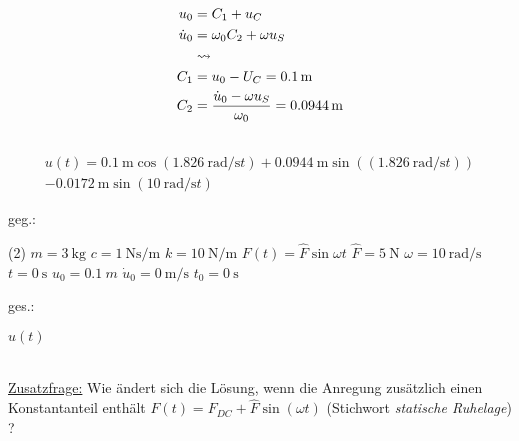 \documentclass[12pt]{exam}
\begin{document}
\begin{questions}
\begin{solution}
    \begin{align*}
        u_0 &= C_1 + u_C \\
        \dot{u}_0 &= \omega_0 C_2+\omega u_S\\
        &\rightsquigarrow \\
        C_1 &=  u_0 - U_C = \SI{0.1}{\meter}\\
        C_2 &= \frac{\dot{u}_0 - \omega u_S}{\omega_0} = \SI{0.0944}{\meter} \\
        \vspace{1cm}
        \end{align*}
        \begin{equation*}
            \begin{split}
        u(t) = \SI{0.1}{\meter} \cos{(\SI{1.826}{\radian\per\second} t)} +\SI{0.0944}{\meter} \sin{((\SI{1.826}{\radian\per\second} t))} \\ - \SI{0.0172}{\meter}\sin{(\SI{10}{\radian\per\second} t)}
        \end{split}
        \end{equation*}
    \end{solution}



     \begin{minipage}[t]{.49\linewidth}
        geg.:
        \begin{tasks}(2)
           \task[] $m = \SI{3}{\kilo\gram}$
           \task[] $c = \SI{1}{\newton\second\per\meter}$
           \task[] $k = \SI{10}{\newton\per\meter}$
            \task[] $F(t) = \hat{F} \sin{\omega t}$
           \task[] $\hat{F} = \SI{5}{\newton}$
           \task[] $\omega = \SI{10}{\radian\per\second}$
           \task[] $t=\SI{0}{\second}$
           \task[] $u_0 = \SI{0.1}{m}$
           \task[] $\dot{u}_0 = \SI{0}{\meter\per\second}$
           \task[] $t_0 = \SI{0}{\second}$
        \end{tasks}
        \end{minipage}
        \begin{minipage}[t]{.49\linewidth}
        ges.:
        \begin{tasks}
            \task $u(t)$
        \end{tasks}
        \end{minipage}\\
        \vspace{1cm}
        \underline{Zusatzfrage:} Wie ändert sich die Lösung, wenn die Anregung zusätzlich einen Konstantanteil enthält $F(t) = F_{DC} +\hat{F} \sin{(\omega t)}$ (Stichwort \textit{statische Ruhelage}) ?


\end{questions}
\end{document}
